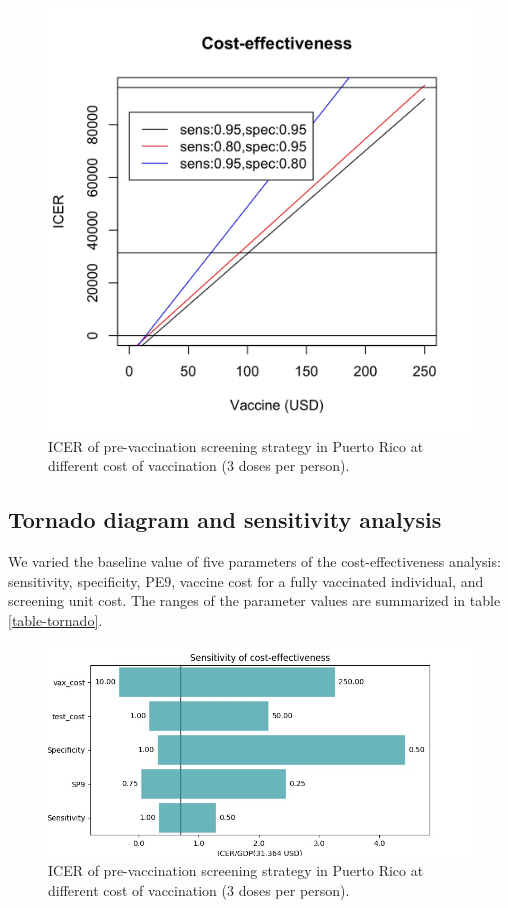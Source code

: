 \documentclass[12pt]{article}
\begin{document}
\begin{figure}[H]
\centering \includegraphics[width=.7\linewidth]{../analysis/figures/report_figure_ICER_PublicPayer_PuertoRico_10y.jpeg}
\caption{ICER of pre-vaccination screening strategy in Puerto Rico at different cost of vaccination (3 doses per person).}
\label{fig-ICER}
\end{figure}

\subsection{Tornado diagram and sensitivity analysis}
We varied the baseline value of five parameters of the cost-effectiveness analysis: sensitivity, specificity, PE9, vaccine cost for a fully vaccinated individual, and screening unit cost. The ranges of the parameter values are summarized in table \ref{table-tornado}.

\begin{figure}[H]
\centering \includegraphics[width=.8\linewidth]{../analysis/figures/report_figure_tornado_diagram.jpeg}
\caption{ICER of pre-vaccination screening strategy in Puerto Rico at different cost of vaccination (3 doses per person).}
\label{fig-tornado}
\end{figure}
\end{document}
